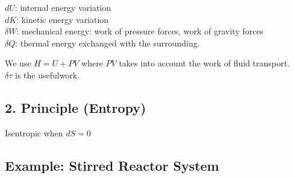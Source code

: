 \documentclass[10pt,a4paper]{scrartcl}
\begin{document}
\begin{multicols*}{3}

$dU$: internal energy variation \\
$dK$: kinetic energy variation \\
$\delta W$: mechanical energy: work of pressure forces, work of gravity forces \\
$\delta Q$: thermal energy exchanged with the surrounding.


We use $H=U+PV$ where $PV$ takes into account the work of fluid transport. \\
$\delta\tau$ is the \glqq useful\grqq work.

\subsection{2. Principle (Entropy)}



Isentropic when $dS=0$

\subsection{Example: Stirred Reactor System}




\end{multicols*}
\end{document}
